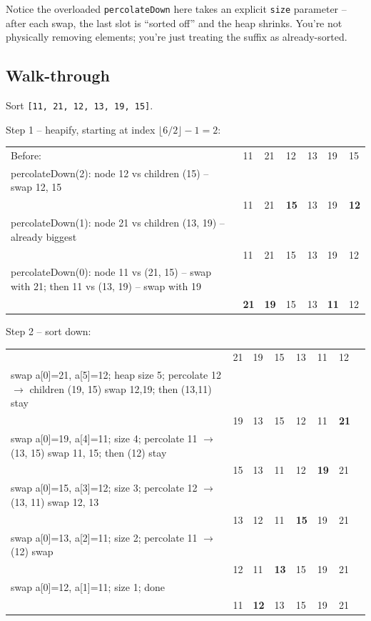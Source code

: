 \documentclass[11pt]{article}
\begin{document}
Notice the overloaded \texttt{percolateDown} here takes an explicit \texttt{size} parameter -- after each swap, the last slot is ``sorted off'' and the heap shrinks. You're not physically removing elements; you're just treating the suffix as already-sorted.

\subsection*{Walk-through}

Sort \texttt{[11, 21, 12, 13, 19, 15]}.

Step 1 -- heapify, starting at index $\lfloor 6/2 \rfloor - 1 = 2$:

\begin{center}
\begin{tabular}{lllllll}
Before: & 11 & 21 & 12 & 13 & 19 & 15 \\
percolateDown(2): node 12 vs children (15) -- swap 12, 15 \\
 & 11 & 21 & \textbf{15} & 13 & 19 & \textbf{12} \\
percolateDown(1): node 21 vs children (13, 19) -- already biggest \\
 & 11 & 21 & 15 & 13 & 19 & 12 \\
percolateDown(0): node 11 vs (21, 15) -- swap with 21; then 11 vs (13, 19) -- swap with 19 \\
 & \textbf{21} & \textbf{19} & 15 & 13 & \textbf{11} & 12 \\
\end{tabular}
\end{center}

Step 2 -- sort down:

\begin{center}
\begin{tabular}{llllllll}
 & 21 & 19 & 15 & 13 & 11 & 12 \\
swap a[0]=21, a[5]=12; heap size 5; percolate 12 $\to$ children (19, 15) swap 12,19; then (13,11) stay \\
 & 19 & 13 & 15 & 12 & 11 & \textbf{21} \\
swap a[0]=19, a[4]=11; size 4; percolate 11 $\to$ (13, 15) swap 11, 15; then (12) stay \\
 & 15 & 13 & 11 & 12 & \textbf{19} & 21 \\
swap a[0]=15, a[3]=12; size 3; percolate 12 $\to$ (13, 11) swap 12, 13 \\
 & 13 & 12 & 11 & \textbf{15} & 19 & 21 \\
swap a[0]=13, a[2]=11; size 2; percolate 11 $\to$ (12) swap \\
 & 12 & 11 & \textbf{13} & 15 & 19 & 21 \\
swap a[0]=12, a[1]=11; size 1; done \\
 & 11 & \textbf{12} & 13 & 15 & 19 & 21 \\
\end{tabular}
\end{center}
\end{document}
